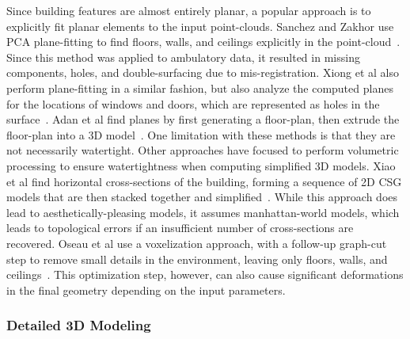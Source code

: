 \documentclass[journal]{IEEEtran}
\begin{document}
Since building features are almost entirely planar, a popular approach is to explicitly fit planar elements to the input point-clouds.  Sanchez and Zakhor use PCA plane-fitting to find floors, walls, and ceilings explicitly in the point-cloud~\cite{Victors}. Since this method was applied to ambulatory data, it resulted in missing components, holes, and double-surfacing due to mis-registration.  Xiong et al also perform plane-fitting in a similar fashion, but also analyze the computed planes for the locations of windows and doors, which are represented as holes in the surface~\cite{Xiong13}.  Adan et al find planes by first generating a floor-plan, then extrude the floor-plan into a 3D model~\cite{WallFinder}.  One limitation with these methods is that they are not necessarily watertight.  Other approaches have focused to perform volumetric processing to ensure watertightness when computing simplified 3D models.  Xiao et al find horizontal cross-sections of the building, forming a sequence of 2D CSG models that are then stacked together and simplified~\cite{Museums}.  While this approach does lead to aesthetically-pleasing models, it assumes manhattan-world models, which leads to topological errors if an insufficient number of cross-sections are recovered.  Oseau et al use a voxelization approach, with a follow-up graph-cut step to remove small details in the environment, leaving only floors, walls, and ceilings~\cite{Oesau13}.  This optimization step, however, can also cause significant deformations in the final geometry depending on the input parameters. 

\subsubsection{Detailed 3D Modeling}
\label{sssec:background_3dmodeling}
\end{document}
